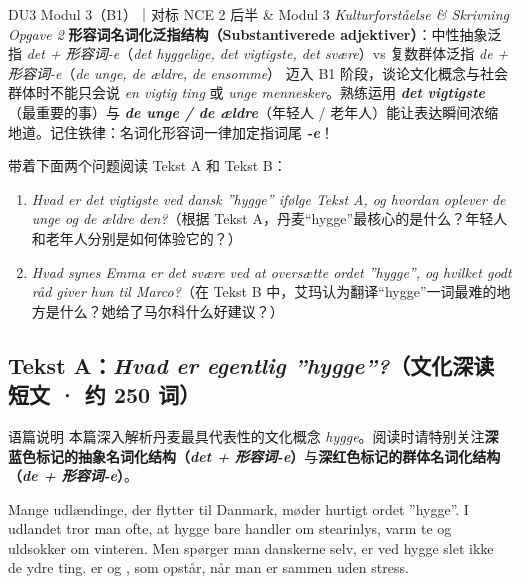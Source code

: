 {DU3 Modul 3（B1）｜对标 NCE 2 后半 \& Modul 3 \textit{Kulturforståelse \& Skrivning Opgave 2}}
{\textbf{形容词名词化泛指结构（Substantiverede adjektiver）}：中性抽象泛指 \textit{det + 形容词-e}（\textit{det hyggelige, det vigtigste, det svære}）vs 复数群体泛指 \textit{de + 形容词-e}（\textit{de unge, de ældre, de ensomme}）}
{迈入 B1 阶段，谈论文化概念与社会群体时不能只会说 \textit{en vigtig ting} 或 \textit{unge mennesker}。熟练运用 \textbf{\textit{det vigtigste}}（最重要的事）与 \textbf{\textit{de unge / de ældre}}（年轻人 / 老年人）能让表达瞬间浓缩地道。记住铁律：名词化形容词一律加定指词尾 \textbf{\textit{-e}}！}

\begin{foerduleaeser}
带着下面两个问题阅读 Tekst A 和 Tekst B：
\begin{enumerate}
  \item \textit{Hvad er det vigtigste ved dansk ”hygge” ifølge Tekst A, og hvordan oplever de unge og de ældre den?}（根据 Tekst A，丹麦“hygge”最核心的是什么？年轻人和老年人分别是如何体验它的？）
  \item \textit{Hvad synes Emma er det svære ved at oversætte ordet ”hygge”, og hvilket godt råd giver hun til Marco?}（在 Tekst B 中，艾玛认为翻译“hygge”一词最难的地方是什么？她给了马尔科什么好建议？）
\end{enumerate}
\end{foerduleaeser}


\subsection*{Tekst A：\textit{Hvad er egentlig ”hygge”?}（文化深读短文 · 约 250 词）}

\begin{tipbox}{语篇说明}
本篇深入解析丹麦最具代表性的文化概念 \textit{hygge}。阅读时请特别关注\textbf{\color{NCDNavy}深蓝色标记的抽象名词化结构（\textit{det + 形容词-e}）}与\textbf{\color{NCDRed}深红色标记的群体名词化结构（\textit{de + 形容词-e}）}。
\end{tipbox}

Mange udlændinge, der flytter til Danmark, møder hurtigt ordet ”hygge”. I udlandet tror man ofte, at hygge bare handler om stearinlys, varm te og uldsokker om vinteren. Men spørger man danskerne selv, er  ved hygge slet ikke de ydre ting.  er  og , som opstår, når man er sammen uden stress.

